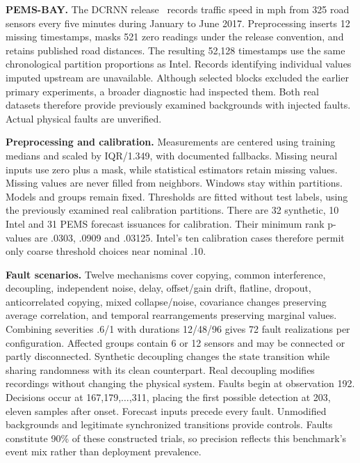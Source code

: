 \documentclass{llncs}
\begin{document}
\textbf{PEMS-BAY.} The DCRNN release~\cite{dcrnn} records traffic speed in mph
from 325 road sensors every five minutes during January to June 2017.
Preprocessing inserts 12 missing timestamps, masks 521 zero readings under
the release convention, and retains published road distances. The resulting
52,128 timestamps use the same chronological partition proportions as Intel.
Records identifying individual values imputed upstream are unavailable.
Although selected blocks excluded the earlier primary experiments, a broader
diagnostic had inspected them. Both real datasets therefore provide previously
examined backgrounds with injected faults. Actual physical faults are unverified.

\textbf{Preprocessing and calibration.} Measurements are centered using
training medians and scaled by IQR/1.349, with documented fallbacks.
Missing neural inputs use zero plus a mask, while statistical estimators
retain missing values. Missing values are never filled from neighbors.
Windows stay within partitions. Models and groups remain fixed.
Thresholds are fitted without test labels, using the previously examined real
calibration partitions. There are 32 synthetic, 10 Intel and 31 PEMS forecast
issuances for calibration. Their minimum rank p-values are .0303, .0909 and
.03125. Intel's ten calibration cases therefore permit only coarse threshold
choices near nominal .10.

\textbf{Fault scenarios.} Twelve mechanisms cover copying, common interference,
decoupling, independent noise, delay, offset/gain drift, flatline, dropout,
anticorrelated copying, mixed collapse/noise, covariance changes preserving
average correlation, and temporal rearrangements preserving marginal values.
Combining severities .6/1 with durations 12/48/96 gives 72 fault realizations
per configuration. Affected groups contain 6 or 12 sensors and may be connected
or partly disconnected. Synthetic decoupling changes the state transition
while sharing randomness with its clean counterpart. Real decoupling modifies
recordings without changing the physical system. Faults begin at observation
192. Decisions occur at 167,179,$\ldots$,311, placing the first possible
detection at 203, eleven samples after onset. Forecast inputs precede every
fault. Unmodified backgrounds and legitimate synchronized transitions provide
controls. Faults constitute 90\% of these constructed trials, so precision
reflects this benchmark's event mix rather than deployment prevalence.
\end{document}
